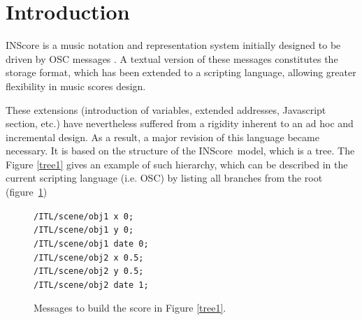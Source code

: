 \documentclass{article}
\title{\papertitle}
\newcommand{\IS}		{INScore}
\newcommand{\code}	[2][0.9]		{\vspace{0mm}\begin{center}\colorbox{mygrey}{
							\begin{minipage}[t]{#1\columnwidth} 
							{\small \texttt{#2}}
							\end{minipage}}\end{center}}
\begin{document}
%
\capstartfalse
\maketitle
\capstarttrue
%
\begin{abstract}
The work presented is part of the \IS\ project, an environment for the design of augmented interactive music scores, oriented towards unconventional uses of music notation and representation, without excluding classical approaches. This environment is fully controllable using Open Sound Control [OSC] messages. \IS\ scripting language is an extended textual version of OSC messages that allows you to design scores in a modular and incremental way. This article presents a major revision of this scripting language, based on the description and manipulation of trees.
\end{abstract}
%

\section{Introduction}\label{sec:introduction}

\IS \cite{Fober:12a} is a music notation and representation system initially designed to be driven by OSC messages \cite{OSC}. A textual version of these messages constitutes the storage format, which has been extended to a scripting language, \cite{Fober:13b} allowing greater flexibility in music scores design.

These extensions (introduction of variables, extended addresses, Javascript section, etc.) have nevertheless suffered from a rigidity inherent to an ad hoc and incremental design. As a result, a major revision of this language became necessary. It is based on the structure of the \IS\ model, which is a tree. 
The Figure \ref{tree1} gives an example of such hierarchy, which can be described in the current scripting language (i.e. OSC) by listing all branches from the root (figure~\ref{script1})
\begin{figure}[htbp]
\code{/ITL/scene/obj1 x 0;\\
/ITL/scene/obj1 y    0;\\
/ITL/scene/obj1 date 0;\\
/ITL/scene/obj2 x    0.5;\\
/ITL/scene/obj2 y    0.5;\\
/ITL/scene/obj2 date 1;
}
\caption{Messages to build the score in Figure \ref{tree1}.}
\label{script1}
\end{figure}
\end{document}
